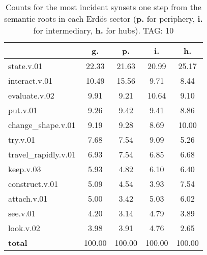 \begin{table}[h!]
\begin{center}
\begin{tabular}{| l || c | c | c | c |}\hline
 & {\bf g.} & {\bf p.} & {\bf i.} & {\bf h.} \\\hline\hline
state.v.01 & 22.33  & 21.63  & 20.99  & 25.17 \\\hline
interact.v.01 & 10.49  & 15.56  & 9.71  & 8.44 \\\hline
evaluate.v.02 & 9.91  & 9.21  & 10.64  & 9.10 \\\hline
put.v.01 & 9.26  & 9.42  & 9.41  & 8.86 \\\hline
change\_shape.v.01 & 9.19  & 9.28  & 8.69  & 10.00 \\\hline
try.v.01 & 7.68  & 7.54  & 9.09  & 5.26 \\\hline
travel\_rapidly.v.01 & 6.93  & 7.54  & 6.85  & 6.68 \\\hline
keep.v.03 & 5.93  & 4.82  & 6.10  & 6.40 \\\hline
construct.v.01 & 5.09  & 4.54  & 3.93  & 7.54 \\\hline
attach.v.01 & 5.00  & 3.42  & 5.03  & 6.02 \\\hline
see.v.01 & 4.20  & 3.14  & 4.79  & 3.89 \\\hline
look.v.02 & 3.98  & 3.91  & 4.76  & 2.65 \\\hline\hline
{{\bf total}} & 100.00  & 100.00  & 100.00  & 100.00 \\\hline
\end{tabular}
\caption{Counts for the most incident synsets one step from the semantic roots in each Erd\"os sector ({\bf p.} for periphery, {\bf i.} for intermediary, {\bf h.} for hubs). TAG: 10}
\end{center}
\end{table}
